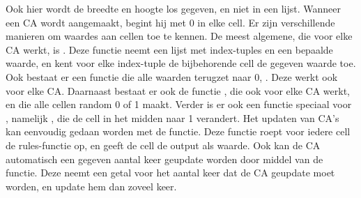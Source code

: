 {}\markdownRendererInterblockSeparator
{}Ook hier wordt de breedte en hoogte los gegeven, en niet in een lijst.\markdownRendererInterblockSeparator
{}\markdownRendererInterblockSeparator
{}Wanneer een CA wordt aangemaakt, begint hij met 0 in elke cell. Er zijn verschillende manieren om waardes aan cellen toe te kennen.\markdownRendererInterblockSeparator
{}De meest algemene, die voor elke CA werkt, is . Deze functie neemt een lijst met index-tuples en een bepaalde waarde, en kent voor elke index-tuple de bijbehorende cell de gegeven waarde toe.\markdownRendererInterblockSeparator
{}\markdownRendererInterblockSeparator
{}Ook bestaat er een functie die alle waarden terugzet naar 0, . Deze werkt ook voor elke CA.\markdownRendererInterblockSeparator
{}\markdownRendererInterblockSeparator
{}Daarnaast bestaat er ook de functie , die ook voor elke CA werkt, en die alle cellen random 0 of 1 maakt.\markdownRendererInterblockSeparator
{}\markdownRendererInterblockSeparator
{}Verder is er ook een functie speciaal voor , namelijk , die de cell in het midden naar 1 verandert.\markdownRendererInterblockSeparator
{}\markdownRendererInterblockSeparator
{}\markdownRendererInterblockSeparator
{}Het updaten van CA's kan eenvoudig gedaan worden met de  functie. Deze functie roept voor iedere cell de rules-functie op, en geeft de cell de output als waarde.\markdownRendererInterblockSeparator
{}\markdownRendererInterblockSeparator
{}Ook kan de CA automatisch een gegeven aantal keer geupdate worden door middel van de  functie. Deze neemt een getal voor het aantal keer dat de CA geupdate moet worden, en update hem dan zoveel keer.\markdownRendererInterblockSeparator
